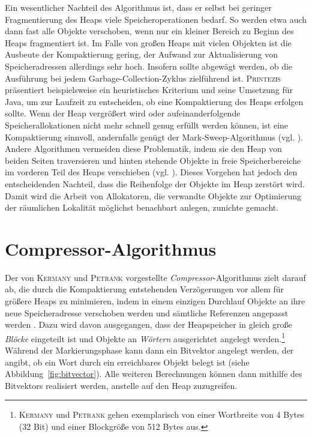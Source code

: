 Ein wesentlicher Nachteil des Algorithmus ist, dass er selbst bei geringer Fragmentierung des Heaps viele Speicheroperationen bedarf.
So werden etwa auch dann fast alle Objekte verschoben, wenn nur ein kleiner Bereich zu Beginn des Heaps fragmentiert ist.
Im Falle von großen Heaps mit vielen Objekten ist die Ausbeute der Kompaktierung gering, der Aufwand zur Aktualisierung von Speicheradressen allerdings sehr hoch.
Insofern sollte abgewägt werden, ob die Ausführung bei jedem Garbage-Collection-Zyklus zielführend ist.
\textsc{Printezis} präsentiert beispielsweise ein heuristisches Kriterium und seine Umsetzung für Java, um zur Laufzeit zu entscheiden, ob eine Kompaktierung des Heaps erfolgen sollte.
Wenn der Heap vergrößert wird oder aufeinanderfolgende Speicherallokationen nicht mehr schnell genug erfüllt werden können, ist eine Kompaktierung sinnvoll, andernfalls genügt der Mark-Sweep-Algorithmus (vgl. \cite[Kap. 3.4]{printezis2001}).
Andere Algorithmen vermeiden diese Problematik, indem sie den Heap von beiden Seiten traversieren und hinten stehende Objekte in freie Speicherbereiche im vorderen Teil des Heaps verschieben (vgl. \cite[S. 32f]{handbook}).
Dieses Vorgehen hat jedoch den entscheidenden Nachteil, dass die Reihenfolge der Objekte im Heap zerstört wird.
Damit wird die Arbeit von Allokatoren, die verwandte Objekte zur Optimierung der räumlichen Lokalität möglichst benachbart anlegen, zunichte gemacht.




\section{Compressor-Algorithmus}
\label{sec:compressor}

Der von \textsc{Kermany} und \textsc{Petrank} vorgestellte \textit{Compressor}-Algorithmus zielt darauf ab, die durch die Kompaktierung entstehenden Verzögerungen vor allem für größere Heaps zu minimieren, indem in einem einzigen Durchlauf Objekte an ihre neue Speicheradresse verschoben werden und sämtliche Referenzen angepasst werden \cite{kermany2006}.
Dazu wird davon ausgegangen, dass der Heapspeicher in gleich große \textit{Blöcke} eingeteilt ist und Objekte an \textit{Wörtern} ausgerichtet angelegt werden.\footnote{\textsc{Kermany} und \textsc{Petrank} gehen exemplarisch von einer Wortbreite von 4 Bytes (32 Bit) und einer Blockgröße von 512 Bytes aus.}
Während der Markierungsphase kann dann ein Bitvektor angelegt werden, der angibt, ob ein Wort durch ein erreichbares Objekt belegt ist (siehe Abbildung~\ref{fig:bitvector}).
Alle weiteren Berechnungen können dann mithilfe des Bitvektors realisiert werden, anstelle auf den Heap zuzugreifen.

